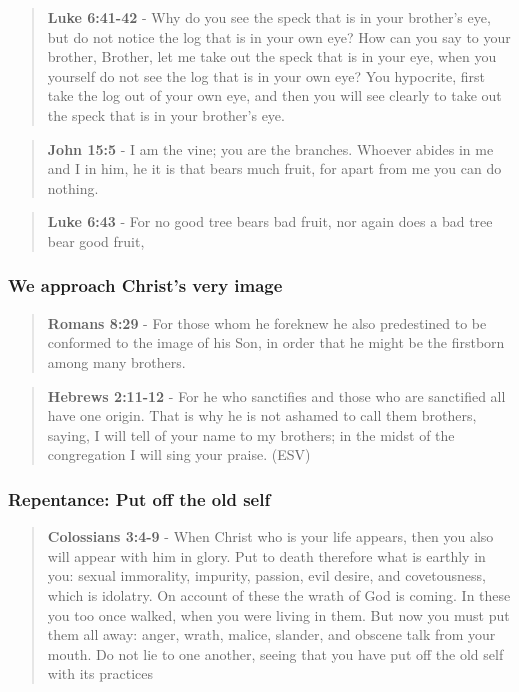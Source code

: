 \documentclass[11pt]{article}
\begin{document}
\begin{quote}
\textbf{Luke 6:41-42} - Why do you see the speck that is in your brother's eye, but do not notice the log that is in your own eye? How can you say to your brother, Brother, let me take out the speck that is in your eye, when you yourself do not see the log that is in your own eye? You hypocrite, first take the log out of your own eye, and then you will see clearly to take out the speck that is in your brother's eye.
\end{quote}

\begin{quote}
\textbf{John 15:5} - I am the vine; you are the branches. Whoever abides in me and I in him, he it is that bears much fruit, for apart from me you can do nothing.
\end{quote}

\begin{quote}
\textbf{Luke 6:43} - For no good tree bears bad fruit, nor again does a bad tree bear good fruit,
\end{quote}

\subsubsection{We approach Christ's very image}
\label{sec:org016159c}
\begin{quote}
\textbf{Romans 8:29} - For those whom he foreknew he also predestined to be conformed to the image of his Son, in order that he might be the firstborn among many brothers.
\end{quote}

\begin{quote}
\textbf{Hebrews 2:11-12} -  For he who sanctifies and those who are sanctified all have one origin.  That is why he is not ashamed to call them brothers, saying, I will tell of your name to my brothers; in the midst of the congregation I will sing your praise.  (ESV)
\end{quote}

\subsubsection{Repentance: Put off the old self}
\label{sec:orgd6b19f7}
\begin{quote}
\textbf{Colossians 3:4-9} - When Christ who is your life appears, then you also will appear with him in glory. Put to death therefore what is earthly in you: sexual immorality, impurity, passion, evil desire, and covetousness, which is idolatry. On account of these the wrath of God is coming. In these you too once walked, when you were living in them. But now you must put them all away: anger, wrath, malice, slander, and obscene talk from your mouth. Do not lie to one another, seeing that you have put off the old self with its practices
\end{quote}
\end{document}
